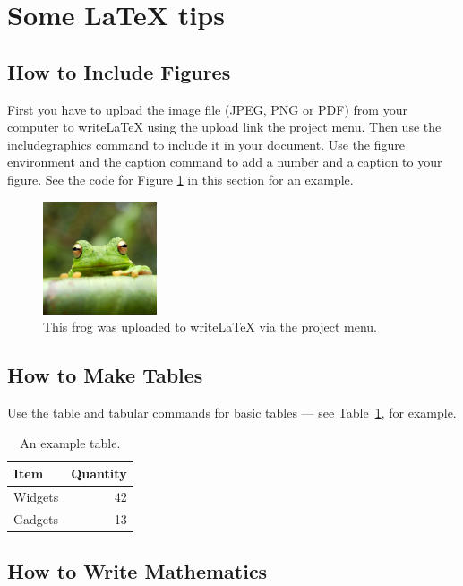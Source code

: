 \documentclass[a4paper]{article}
\begin{document}
\newpage
\section{Some LaTeX tips}
\label{sec:latex}
\subsection{How to Include Figures}

First you have to upload the image file (JPEG, PNG or PDF) from your computer to writeLaTeX using the upload link the project menu. Then use the includegraphics command to include it in your document. Use the figure environment and the caption command to add a number and a caption to your figure. See the code for Figure \ref{fig:frog} in this section for an example.

\begin{figure}
\centering
\includegraphics[width=0.3\textwidth]{frog.jpg}
\caption{\label{fig:frog}This frog was uploaded to writeLaTeX via the project menu.}
\end{figure}

\subsection{How to Make Tables}

Use the table and tabular commands for basic tables --- see Table~\ref{tab:widgets}, for example.

\begin{table}
\centering
\begin{tabular}{l|r}
Item & Quantity \\\hline
Widgets & 42 \\
Gadgets & 13
\end{tabular}
\caption{\label{tab:widgets}An example table.}
\end{table}

\subsection{How to Write Mathematics}
\end{document}
